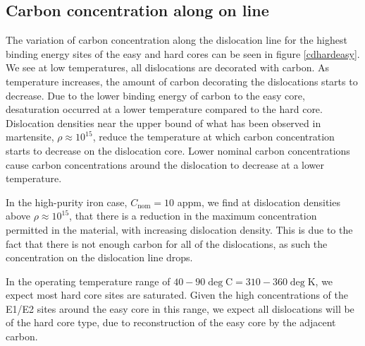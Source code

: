 \documentclass[a4paper,11pt]{article}
\begin{document}
\subsection{Carbon concentration along on line}
\label{sec:org07bc1af}

The variation of carbon concentration along the dislocation line for the highest
binding energy sites of the easy and hard cores can be seen in figure
\ref{cdhardeasy}. We see at low temperatures, all dislocations are
decorated with carbon. As temperature increases, the amount of carbon
decorating the dislocations starts to decrease. Due to the lower binding
energy of carbon to the easy core, desaturation occurred at a lower
temperature compared to the hard core. Dislocation densities near the upper
bound of what has been observed in martensite, \(\rho \approx10^{15}\), reduce
the temperature at which carbon concentration starts to decrease on the
dislocation core. Lower nominal carbon concentrations cause carbon
concentrations around the dislocation to decrease at a lower temperature.

In the high-purity iron case, \(C_{\text{nom}} = 10\) appm, we find at
dislocation densities above \(\rho \approx10^{15}\), that there is a reduction
in the maximum concentration permitted in the material, with increasing
dislocation density. This is due to the fact that there is not enough carbon
for all of the dislocations, as such the concentration on the dislocation line
drops.

In the operating temperature range of \(40-90\deg\text{C} = 310-360\deg\text{K}\), we expect most hard
core sites are saturated. Given the high concentrations of the E1/E2 sites around the easy core
in this range, we expect all dislocations will be of the hard core type, due to reconstruction of
the easy core by the adjacent carbon.
\end{document}
